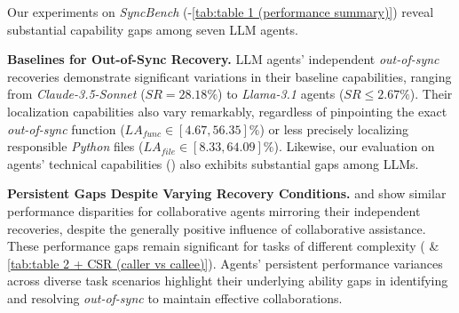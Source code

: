 Our experiments on \textit{SyncBench} (-\ref{tab:table 1 (performance summary)}) reveal substantial capability gaps among seven LLM agents.

\textbf{Baselines for Out-of-Sync Recovery.}
LLM agents' independent \textit{out-of-sync} recoveries demonstrate significant variations in their baseline capabilities, ranging from \textit{Claude-3.5-Sonnet} ($SR=28.18\%$) to \textit{Llama-3.1} agents ($SR \leq 2.67\%$).
Their localization capabilities also vary remarkably, regardless of pinpointing the exact \textit{out-of-sync} function ($LA_{func} \in [4.67, 56.35]\%$) or less precisely localizing responsible \textit{Python} files ($LA_{file} \in [8.33, 64.09]\%$). Likewise, our evaluation on agents' technical capabilities () also exhibits substantial gaps among LLMs.

\textbf{Persistent Gaps Despite Varying Recovery Conditions.}
 and  show similar performance disparities for collaborative agents mirroring their independent recoveries, despite the generally positive influence of collaborative assistance.
These performance gaps remain significant for tasks of different complexity ( \& \ref{tab:table 2 + CSR (caller vs callee)}).
Agents' persistent performance variances across diverse task scenarios highlight their underlying ability gaps in identifying and resolving \textit{out-of-sync} to maintain effective collaborations.


